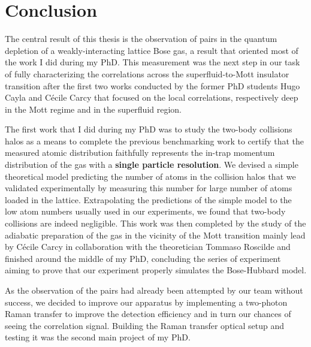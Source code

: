 \chapter*{Conclusion}

\label{chap:conclusion}



The central result of this thesis is the observation of \kmk pairs in the quantum depletion of a weakly-interacting lattice Bose gas, a result that oriented most of the work I did during my PhD. This measurement was the next step in our task of fully characterizing the correlations across the superfluid-to-Mott insulator transition after the first two works \cite{carcy2019momentum,cayla2020} conducted by the former PhD students Hugo Cayla and Cécile Carcy that focused on the local correlations, respectively deep in the Mott regime and in the superfluid region. 

The first work that I did during my PhD was to study the two-body collisions halos \cite{tenart2020two} as a means to complete the previous benchmarking work \cite{cayla2018single} to certify that the measured atomic distribution faithfully represents the in-trap momentum distribution of the gas with a \textbf{single particle resolution}. We devised a simple theoretical model predicting the number of atoms in the collision halos that we validated experimentally by measuring this number for large number of atoms loaded in the lattice. Extrapolating the predictions of the simple model to the low atom numbers usually used in our experiments, we found that two-body collisions are indeed negligible. This work was then completed by the study of the adiabatic preparation of the gas in the vicinity of the Mott transition \cite{carcy2021} mainly lead by Cécile Carcy in collaboration with the theoretician Tommaso Roscilde and finished around the middle of my PhD, concluding the series of experiment aiming to prove that our experiment properly simulates the Bose-Hubbard model.

As the observation of the \kmk pairs had already been attempted by our team without success, we decided to improve our apparatus by implementing a two-photon Raman transfer to improve the detection efficiency and in turn our chances of seeing the \kmk correlation signal. Building the Raman transfer optical setup and testing it was the second main project of my PhD. 

